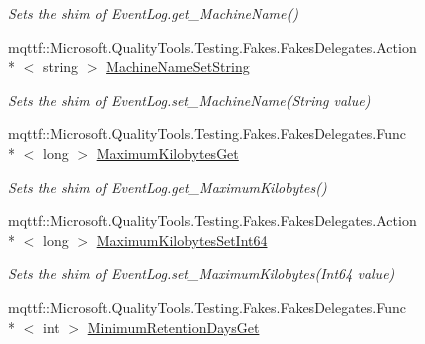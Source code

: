 \begin{DoxyCompactItemize}
\begin{DoxyCompactList}\small\item\em Sets the shim of Event\-Log.\-get\-\_\-\-Machine\-Name()\end{DoxyCompactList}\item 
mqttf\-::\-Microsoft.\-Quality\-Tools.\-Testing.\-Fakes.\-Fakes\-Delegates.\-Action\\*
$<$ string $>$ \hyperlink{class_system_1_1_diagnostics_1_1_fakes_1_1_shim_event_log_a38f4598cd462be0ac706df2e215b3e41}{Machine\-Name\-Set\-String}
\begin{DoxyCompactList}\small\item\em Sets the shim of Event\-Log.\-set\-\_\-\-Machine\-Name(\-String value)\end{DoxyCompactList}\item 
mqttf\-::\-Microsoft.\-Quality\-Tools.\-Testing.\-Fakes.\-Fakes\-Delegates.\-Func\\*
$<$ long $>$ \hyperlink{class_system_1_1_diagnostics_1_1_fakes_1_1_shim_event_log_aa60e418738c2bc576b9188909e648984}{Maximum\-Kilobytes\-Get}
\begin{DoxyCompactList}\small\item\em Sets the shim of Event\-Log.\-get\-\_\-\-Maximum\-Kilobytes()\end{DoxyCompactList}\item 
mqttf\-::\-Microsoft.\-Quality\-Tools.\-Testing.\-Fakes.\-Fakes\-Delegates.\-Action\\*
$<$ long $>$ \hyperlink{class_system_1_1_diagnostics_1_1_fakes_1_1_shim_event_log_a82a8c8b30a956a11a666b9abdc801879}{Maximum\-Kilobytes\-Set\-Int64}
\begin{DoxyCompactList}\small\item\em Sets the shim of Event\-Log.\-set\-\_\-\-Maximum\-Kilobytes(\-Int64 value)\end{DoxyCompactList}\item 
mqttf\-::\-Microsoft.\-Quality\-Tools.\-Testing.\-Fakes.\-Fakes\-Delegates.\-Func\\*
$<$ int $>$ \hyperlink{class_system_1_1_diagnostics_1_1_fakes_1_1_shim_event_log_ac74e3bb34a83d583d59d3fda43697b42}{Minimum\-Retention\-Days\-Get}

\end{DoxyCompactItemize}
